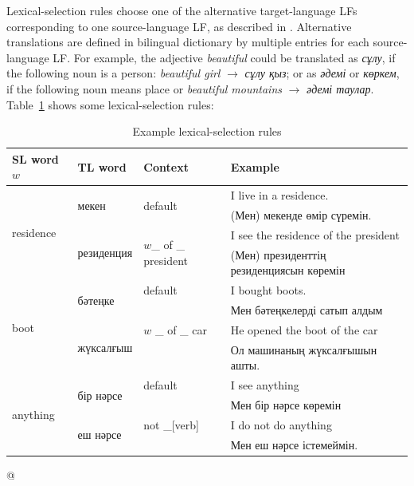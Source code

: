 \documentclass[11pt]{article}
\begin{document}
Lexical-selection rules choose one of the alternative target-language LFs corresponding to one source-language LF, as described in \cite{tyers12a}. Alternative translations are defined in bilingual dictionary by 
multiple entries for each source-language LF. For example, the adjective \emph{beautiful} could be translated as \emph{сұлу}, if 
the following noun is a person: \emph{beautiful girl} \(\to\) \emph{сұлу қыз}; or as \emph{әдемі} or  \emph{көркем}, if the following noun means 
place or  \emph{beautiful mountains} \(\to\) \emph{әдемі таулар}.  Table~\ref{table:lexsel} shows some 
lexical-selection rules:
\begin{table}
 \centering
 \begin{tabular}{|l|l|l|l|}
    \hline
    \textbf{SL word \(w\)} & \textbf{TL word} & \textbf{Context} & \textbf{Example} \\
    \hline
    \multirow{4}{*}{residence} & \multirow{2}{*}{мекен}      & \multirow{2}{*}{default} & I live in a residence. \\
                               &                             &                     & (Мен) мекенде өмір сүремін. \\
                               & \multirow{2}{*}{резиденция} & \multirow{2}{*}{\(w\)\_ of \_ president} & I see the residence of the president \\ 
                               &                             &                                     & (Мен) президенттің резиденциясын көремін \\
    \hline
    \multirow{4}{*}{boot} & \multirow{2}{*}{бәтеңке} & default & I bought boots. \\
                          &                          &     &  Мен бәтеңкелерді сатып алдым \\

                          & \multirow{2}{*}{жүксалғыш} & \(w\) \_ of \_ car &  He opened the boot of the car  \\ 
                          &           &              & Ол машинаның жүксалғышын ашты. \\
    \hline
    \multirow{4}{*}{anything} & \multirow{2}{*}{бір нәрсе} & default & I see anything  
\\ 
                              &           &    & Мен бір нәрсе көремін \\
                              & \multirow{2}{*}{еш нәрсе} & not \_[verb] & I do not do anything \\ 
                              &          &             &  Мен еш нәрсе істемеймін. \\

    \hline
 \end{tabular}
  \caption{Example lexical-selection rules}
  \label{table:lexsel}
\end{table}
@
\end{document}
